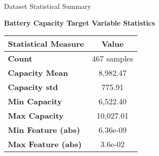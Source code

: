\documentclass[aspectratio=169]{beamer}
\begin{document}
\begin{frame}{Dataset Statistical Summary}
\begin{center}
\textbf{Battery Capacity Target Variable Statistics}
\end{center}

\vspace{0.3cm}
\begin{table}[h]
\centering
\begin{tabular}{@{}lc@{}}
\toprule
\textbf{Statistical Measure} & \textbf{Value} \\
\midrule
\textbf{Count} & 467 samples \\
\textbf{Capacity Mean} & 8,982.47 \\
\textbf{Capacity std} & 775.91 \\
\textbf{Min Capacity}  & 6,522.40 \\
\textbf{Max Capacity} & 10,027.01 \\
\textbf{Min Feature (abs)} & 6.36e-09 \\
\textbf{Max Feature (abs)} & 3.6e-02 \\

\bottomrule
\end{tabular}
\end{table}

\end{frame}
\end{document}
